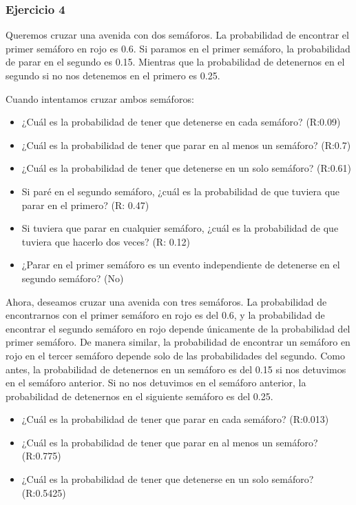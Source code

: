 \documentclass[
]{book}
\providecommand{\tightlist}{%
  \setlength{\itemsep}{0pt}\setlength{\parskip}{0pt}}
\begin{document}
\hypertarget{ejercicio-4}{%
\subsubsection{Ejercicio 4}\label{ejercicio-4}}

Queremos cruzar una avenida con dos semáforos. La probabilidad de encontrar el primer semáforo en rojo es 0.6. Si paramos en el primer semáforo, la probabilidad de parar en el segundo es 0.15. Mientras que la probabilidad de detenernos en el segundo si no nos detenemos en el primero es 0.25.

Cuando intentamos cruzar ambos semáforos:

\begin{itemize}
\tightlist
\item
  ¿Cuál es la probabilidad de tener que detenerse en cada semáforo? (R:0.09)
\item
  ¿Cuál es la probabilidad de tener que parar en al menos un semáforo? (R:0.7)
\item
  ¿Cuál es la probabilidad de tener que detenerse en un solo semáforo? (R:0.61)
\item
  Si paré en el segundo semáforo, ¿cuál es la probabilidad de que tuviera que parar en el primero? (R: 0.47)
\item
  Si tuviera que parar en cualquier semáforo, ¿cuál es la probabilidad de que tuviera que hacerlo dos veces? (R: 0.12)
\item
  ¿Parar en el primer semáforo es un evento independiente de detenerse en el segundo semáforo? (No)
\end{itemize}

Ahora, deseamos cruzar una avenida con tres semáforos. La probabilidad de encontrarnos con el primer semáforo en rojo es del 0.6, y la probabilidad de encontrar el segundo semáforo en rojo depende únicamente de la probabilidad del primer semáforo. De manera similar, la probabilidad de encontrar un semáforo en rojo en el tercer semáforo depende solo de las probabilidades del segundo. Como antes, la probabilidad de detenernos en un semáforo es del 0.15 si nos detuvimos en el semáforo anterior. Si no nos detuvimos en el semáforo anterior, la probabilidad de detenernos en el siguiente semáforo es del 0.25.

\begin{itemize}
\tightlist
\item
  ¿Cuál es la probabilidad de tener que parar en cada semáforo? (R:0.013)
\item
  ¿Cuál es la probabilidad de tener que parar en al menos un semáforo? (R:0.775)
\item
  ¿Cuál es la probabilidad de tener que detenerse en un solo semáforo? (R:0.5425)
\end{itemize}
\end{document}
